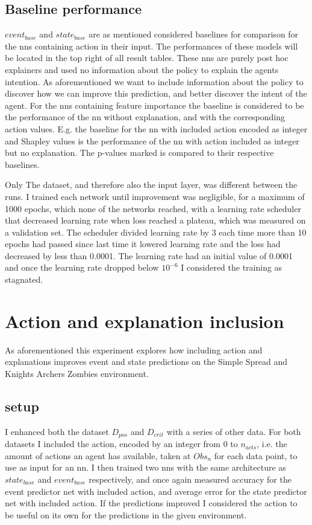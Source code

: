 \documentclass[UKenglish]{uiomasterthesis}
\begin{document}
\subsection{Baseline performance}
$event_{base}$ and $state_{base}$ are as mentioned considered baselines for comparison for the \acp{nn} containing action in their input. The performances of these models will be located in the top right of all result tables. These \acp{nn} are purely post hoc explainers and used no information about the policy to explain the agents intention. As aforementioned we want to include information about the policy to discover how we can improve this prediction, and better discover the intent of the agent. For the \acp{nn} containing feature importance the baseline is considered to be the performance of the \ac{nn} without explanation, and with the corresponding action values. E.g. the baseline for the \ac{nn} with included action encoded as integer and Shapley values is the performance of the \ac{nn} with action included as integer but no explanation. The p-values marked is compared to their respective baselines.

Only The dataset, and therefore also the input layer, was different between the runs. I trained each network until improvement was negligible, for a maximum of 1000 epochs, which none of the networks reached, with a learning rate scheduler that decreased learning rate when loss reached a plateau, which was measured on a validation set. The scheduler divided learning rate by 3 each time more than 10 epochs had passed since last time it lowered learning rate and the loss had decreased by less than 0.0001. The learning rate had an initial value of 0.0001 and once the learning rate dropped below $10^{-6}$ I considered the training as stagnated.

\section{Action and explanation inclusion}
\label{sec:exp_1}
As aforementioned this experiment explores how including action and explanations improves event and state predictions on the Simple Spread and Knights Archers Zombies environment.

\subsection{setup}
I enhanced both the dataset $D_{pos}$ and $D_{crit}$ with a series of other data. For both datasets I included the action, encoded by an integer from $0$ to $n_{acts}$, i.e. the amount of actions an agent has available, taken at $Obs_n$ for each data point, to use as input for an \ac{nn}. I then trained two \acp{nn} with the same architecture as $state_{base}$ and $event_{base}$ respectively, and once again measured accuracy for the event predictor net with included action, and average error for the state predictor net with included action. If the predictions improved I considered the action to be useful on its own for the predictions in the given environment.
\end{document}
